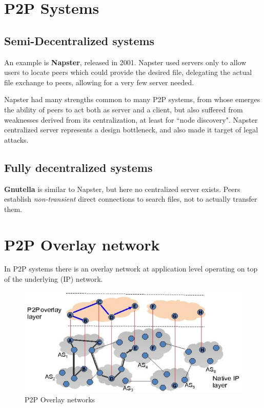 \section{P2P Systems}
\subsection{Semi-Decentralized systems}
An example is \textbf{Napster}, released in 2001.
Napster used servers only to allow users to locate peers which could provide the desired file, delegating the actual file exchange to peers, allowing for a very few server needed.


Napster had many strengths common to many P2P systems, from whose emerges the ability of peers to act both as server and a client, but also suffered from weaknesses derived from its centralization, at least for ``node discovery".
Napster centralized server represents a design bottleneck, and also made it target of legal attacks.

\subsection{Fully decentralized systems}
\textbf{Gnutella} is similar to Napster, but here no centralized server exists.
Peers establish \textit{non-transient} direct connections to search files, not to actually transfer them.



\section{P2P Overlay network}
In P2P systems there is an overlay network at application level operating on top of the underlying (IP) network.
\begin{figure}[htbp]
   \centering
   \includegraphics{images/P2Poverlay.png}
   \caption{P2P Overlay networks}
   \label{fig:P2Poverlay}
\end{figure}

